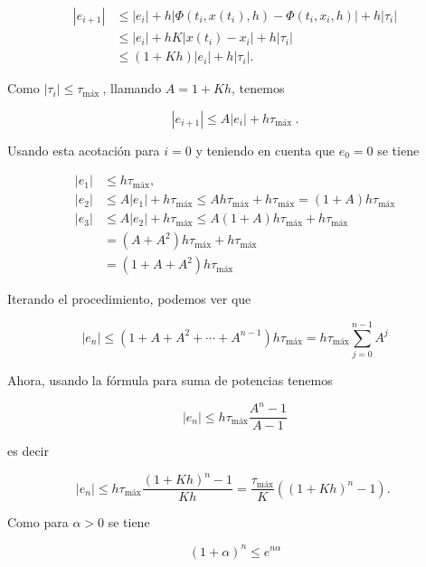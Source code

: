 \documentclass[10pt]{article}
\begin{document}
$$
\begin{aligned}
\left|e_{i+1}\right| & \leq\left|e_{i}\right|+h\left|\Phi\left(t_{i}, x\left(t_{i}\right), h\right)-\Phi\left(t_{i}, x_{i}, h\right)\right|+h\left|\tau_{i}\right| \\
& \leq\left|e_{i}\right|+h K\left|x\left(t_{i}\right)-x_{i}\right|+h\left|\tau_{i}\right| \\
& \leq(1+K h)\left|e_{i}\right|+h\left|\tau_{i}\right| .
\end{aligned}
$$

Como $\left|\tau_{i}\right| \leq \tau_{\text {máx }}$, llamando $A=1+K h$, tenemos

$$
\left|e_{i+1}\right| \leq A\left|e_{i}\right|+h \tau_{\text {máx }} .
$$

Usando esta acotación para $i=0$ y teniendo en cuenta que $e_{0}=0$ se tiene

$$
\begin{aligned}
\left|e_{1}\right| & \leq h \tau_{\operatorname{máx}}, \\
\left|e_{2}\right| & \leq A\left|e_{1}\right|+h \tau_{\operatorname{máx}} \leq A h \tau_{\operatorname{máx}}+h \tau_{\operatorname{máx}}=(1+A) h \tau_{\operatorname{máx}} \\
\left|e_{3}\right| & \leq A\left|e_{2}\right|+h \tau_{\operatorname{máx}} \leq A(1+A) h \tau_{\operatorname{máx}}+h \tau_{\operatorname{máx}} \\
& =\left(A+A^{2}\right) h \tau_{\operatorname{máx}}+h \tau_{\operatorname{máx}} \\
& =\left(1+A+A^{2}\right) h \tau_{\operatorname{máx}}
\end{aligned}
$$

Iterando el procedimiento, podemos ver que

$$
\left|e_{n}\right| \leq\left(1+A+A^{2}+\cdots+A^{n-1}\right) h \tau_{\operatorname{máx}}=h \tau_{\operatorname{máx}} \sum_{j=0}^{n-1} A^{j}
$$

Ahora, usando la fórmula para suma de potencias tenemos

$$
\left|e_{n}\right| \leq h \tau_{\operatorname{máx}} \frac{A^{n}-1}{A-1}
$$

es decir

$$
\left|e_{n}\right| \leq h \tau_{\operatorname{máx}} \frac{(1+K h)^{n}-1}{K h}=\frac{\tau_{\operatorname{máx}}}{K}\left((1+K h)^{n}-1\right) \text {. }
$$

Como para $\alpha>0$ se tiene

$$
(1+\alpha)^{n} \leq e^{n \alpha}
$$
\end{document}
